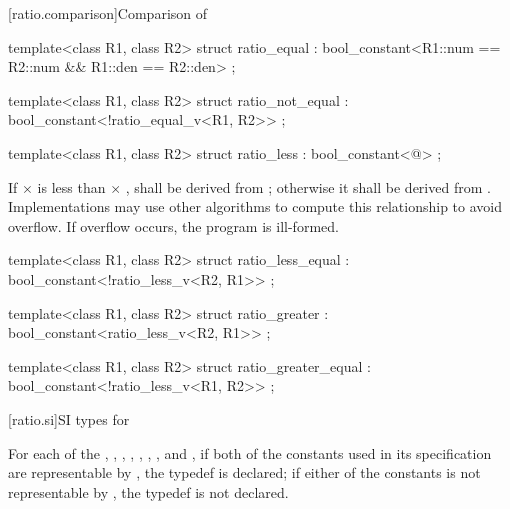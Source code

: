 [ratio.comparison]{Comparison of }

%
\begin{itemdecl}
template<class R1, class R2>
  struct ratio_equal : bool_constant<R1::num == R2::num && R1::den == R2::den> { };
\end{itemdecl}

%
\begin{itemdecl}
template<class R1, class R2>
  struct ratio_not_equal : bool_constant<!ratio_equal_v<R1, R2>> { };
\end{itemdecl}

%
\begin{itemdecl}
template<class R1, class R2>
  struct ratio_less : bool_constant<@\seebelow@> { };
\end{itemdecl}

\begin{itemdescr}
\pnum
If  $\times$  is less than  $\times$ ,
 shall be
derived from ; otherwise it shall be derived from
. Implementations may use other algorithms to
compute this relationship to avoid overflow. If overflow occurs, the program is ill-formed.
\end{itemdescr}

%
\begin{itemdecl}
template<class R1, class R2>
  struct ratio_less_equal : bool_constant<!ratio_less_v<R2, R1>> { };
\end{itemdecl}

%
\begin{itemdecl}
template<class R1, class R2>
  struct ratio_greater : bool_constant<ratio_less_v<R2, R1>> { };
\end{itemdecl}

%
\begin{itemdecl}
template<class R1, class R2>
  struct ratio_greater_equal : bool_constant<!ratio_less_v<R1, R2>> { };
\end{itemdecl}

[ratio.si]{SI types for }

\pnum
{}%
%
%
%
%
%
%
%
For each of the 
, ,
, ,
, ,
, and ,
if both of the constants used in its
specification are representable by , the typedef is
declared; if either of the constants is not representable by ,
the typedef is not declared.
